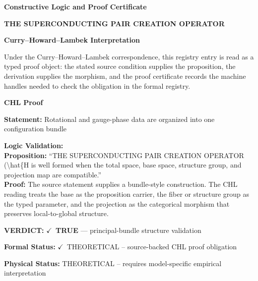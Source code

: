 \clearpage
\begingroup\tzpsupportsetup
\noindent\textbf{\fontsize{10.8pt}{12.8pt}\selectfont [ID 0591] Constructive Logic and Proof Certificate}\par
\noindent\textbf{\fontsize{10pt}{12pt}\selectfont THE SUPERCONDUCTING PAIR CREATION OPERATOR}\par
\vspace{0.45em}
\begingroup
\footnotesize
\setlength{\parskip}{0.22em}
\setlength{\parindent}{0pt}
\noindent\textbf{Curry--Howard--Lambek Interpretation}\par
Under the Curry--Howard--Lambek correspondence, this registry entry is read as a typed proof
object: the stated source condition supplies the proposition, the derivation supplies the
morphism, and the proof certificate records the machine handles needed to check the obligation
in the formal registry.

\vspace{0.45em}
\noindent\textbf{CHL Proof}\par
\textbf{Statement:} Rotational and gauge-phase data are organized into one configuration bundle

\textbf{Logic Validation:}\\
\textbf{Proposition:} ``THE SUPERCONDUCTING PAIR CREATION OPERATOR (\textbackslash{}hat\{H is well formed when the total space,
base space, structure group, and projection map are compatible.''\\
\textbf{Proof:} The source statement supplies a bundle-style construction. The CHL reading treats the
base as the proposition carrier, the fiber or structure group as the typed parameter,
and the projection as the categorical morphism that preserves local-to-global structure.

\textbf{VERDICT:} \ensuremath{\checkmark}\ \textbf{TRUE} --- principal-bundle structure validation

\textbf{Formal Status:} \ensuremath{\checkmark}\ THEORETICAL -- source-backed CHL proof obligation

\textbf{Physical Status:} THEORETICAL -- requires model-specific empirical interpretation
\par\vspace{0.45em}
\par
\ifTZPDarkEdition
{}
\fi
\endgroup
\endgroup
